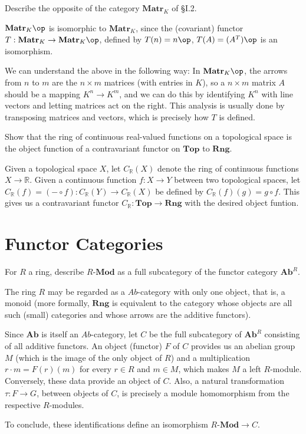 \begin{exercise}
Describe the opposite of the category $\mathbf{Matr}_K$ of \S I.2.
\end{exercise}
\begin{solution}
$\mathbf{Matr}_K\op$ is isomorphic to $\mathbf{Matr}_K$, since the (covariant) functor $T:\mathbf{Matr}_K\to\mathbf{Matr}_K\op$, defined by $T(n)=n\op$, $T(A)=(A^T)\op$ is an isomorphism.

We can understand the above in the following way: In $\mathbf{Matr}_K\op$, the arrows from $n$ to $m$ are the $n\times m$ matrices (with entries in $K$), so a $n\times m$ matrix $A$ should be a mapping $K^n\to K^m$, and we can do this by identifying $K^n$ with line vectors and letting matrices act on the right. This analysis is usually done by transposing matrices and vectors, which is precisely how $T$ is defined.
\end{solution}

\begin{exercise}
Show that the ring of continuous real-valued functions on a topological space is the object function of a contravariant functor on $\mathbf{Top}$ to $\mathbf{Rng}$.
\end{exercise}
\begin{solution}
Given a topological space $X$, let $C_\mathbb{R}(X)$ denote the ring of continuous functions $X\to \mathbb{R}$. Given a continuous function $f:X\to Y$ between two topological spaces, let $C_\mathbb{R}(f)=(-\circ f):C_\mathbb{R}(Y)\to C_\mathbb{R}(X)$ be defined by $C_\mathbb{R}(f)(g)=g\circ f$. This gives us a contravariant functor $C_\mathbb{R}:\mathbf{Top}\to\mathbf{Rng}$ with the desired object funtion.
\end{solution}

\section{Functor Categories}

\begin{exercise}
For $R$ a ring, describe $R\text{-}\mathbf{Mod}$ as a full subcategory of the functor category $\mathbf{Ab}^R$.
\end{exercise}
\begin{solution}
The ring $R$ may be regarded as a $Ab$-category with only one object, that is, a monoid (more formally, $\mathbf{Rng}$ is equivalent to the  category whose objects are all such (small) categories and whose arrows are the additive functors).

Since $\mathbf{Ab}$ is itself an $Ab$-category, let $C$ be the full subcategory of $\mathbf{Ab}^R$ consisting of all additive functors. An object (functor) $F$ of $C$ provides us an abelian group $M$ (which is the image of the only object of $R$) and a multiplication $r\cdot m=F(r)(m)$ for every $r\in R$ and $m\in M$, which makes $M$ a left $R$-module. Conversely, these data provide an object of $C$. Also, a natural transformation $\tau:F\dot{\to} G$, between objects of $C$, is precisely a module homomorphism from the respective $R$-modules.

To conclude, these identifications define an isomorphism $R\text{-}\mathbf{Mod}\to C$.
\end{solution}

